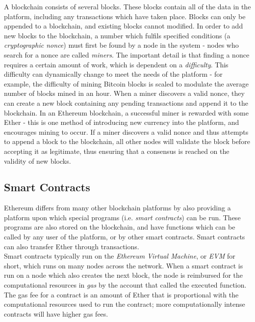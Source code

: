 A blockchain consists of several blocks. These blocks contain all of the data in the platform, including any transactions which have taken place. Blocks can only be appended to a blockchain, and existing blocks cannot modified. In order to add new blocks to the blockchain, a number which fulfils specified conditions (a \textit{cryptographic nonce}) must first be found by a node in the system - nodes who search for a nonce are called \textit{miners}. The important detail is that finding a nonce requires a certain amount of work, which is dependent on a \textit{difficulty}. This difficulty can dynamically change to meet the needs of the platform - for example, the difficulty of mining Bitcoin blocks is scaled to modulate the average number of blocks mined in an hour\cite{Bitc}. When a miner discovers a valid nonce, they can create a new block containing any pending transactions and append it to the blockchain\cite{Eth}. In an Ethereum blockchain, a successful miner is rewarded with some Ether - this is one method of introducing new currency into the platform, and encourages mining to occur. If a miner discovers a valid nonce and thus attempts to append a block to the blockchain, all other nodes will validate the block before accepting it as legitimate, thus ensuring that a consensus is reached on the validity of new blocks\cite{Bitc}.

\subsection{Smart Contracts}

Ethereum differs from many other blockchain platforms by also providing a platform upon which special programs (i.e. \textit{smart contracts}) can be run. These programs are also stored on the blockchain, and have functions which can be called by any user of the platform, or by other smart contracts. Smart contracts can also transfer Ether through transactions. \\

Smart contracts typically run on the \textit{Ethereum Virtual Machine}, or \textit{EVM} for short, which runs on many nodes across the network. When a smart contract is run on a node which also creates the next block, the node is reimbursed for the computational resources in \textit{gas} by the account that called the executed function. The gas fee for a contract is an amount of Ether that is proportional with the computational resources used to run the contract; more computationally intense contracts will have higher gas fees. \\

